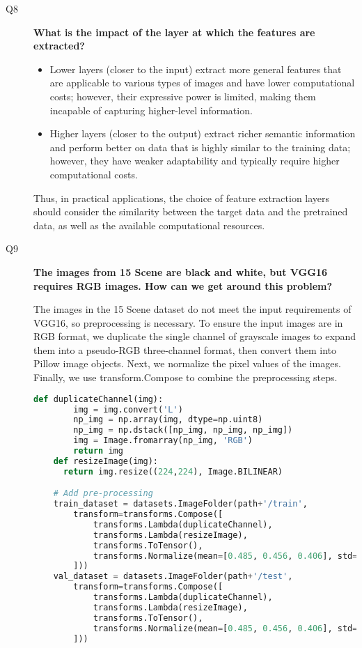 \documentclass{rapportECL}
\begin{document}
\begin{description}
    \item[Q8] \textbf{What is the impact of the layer at which the features are extracted?}

    \begin{itemize}
        \item Lower layers (closer to the input) extract more general features that are applicable to various types of images and have lower computational costs; however, their expressive power is limited, making them incapable of capturing higher-level information.
        \item Higher layers (closer to the output) extract richer semantic information and perform better on data that is highly similar to the training data; however, they have weaker adaptability and typically require higher computational costs.
    \end{itemize}
    Thus, in practical applications, the choice of feature extraction layers should consider the similarity between the target data and the pretrained data, as well as the available computational resources.

    \item[Q9] \textbf{The images from 15 Scene are black and white, but VGG16 requires RGB images. How can we get around this problem?}

    The images in the 15 Scene dataset do not meet the input requirements of VGG16, so preprocessing is necessary. To ensure the input images are in RGB format, we duplicate the single channel of grayscale images to expand them into a pseudo-RGB three-channel format, then convert them into Pillow image objects. Next, we normalize the pixel values of the images. Finally, we use transform.Compose to combine the preprocessing steps.
    \begin{lstlisting}[language=Python]
    def duplicateChannel(img):
        img = img.convert('L')
        np_img = np.array(img, dtype=np.uint8)
        np_img = np.dstack([np_img, np_img, np_img])
        img = Image.fromarray(np_img, 'RGB') 
        return img
    def resizeImage(img):
      return img.resize((224,224), Image.BILINEAR)

    # Add pre-processing
    train_dataset = datasets.ImageFolder(path+'/train',
        transform=transforms.Compose([
            transforms.Lambda(duplicateChannel),
            transforms.Lambda(resizeImage),
            transforms.ToTensor(),
            transforms.Normalize(mean=[0.485, 0.456, 0.406], std=[0.229, 0.224, 0.225])
        ]))
    val_dataset = datasets.ImageFolder(path+'/test',
        transform=transforms.Compose([
            transforms.Lambda(duplicateChannel),
            transforms.Lambda(resizeImage),
            transforms.ToTensor(),
            transforms.Normalize(mean=[0.485, 0.456, 0.406], std=[0.229, 0.224, 0.225])
        ]))
    \end{lstlisting}
  
\end{description}
\end{document}
